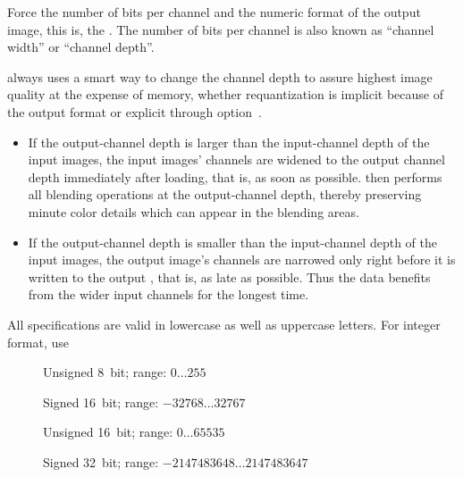 \begin{codelist}
  \label{opt:depth}%
\item[\itempar{-d \metavar{DEPTH} \\ --depth=\metavar{DEPTH}}]\itemend
  Force the number of bits per channel and the numeric format of the output image, this is, the
  .  The number of bits per channel is also known as ``channel width'' or
  ``channel depth''.

  \App{} always uses a smart way to change the channel depth to assure highest image quality at
  the expense of memory, whether requantization is implicit because of the output format or
  explicit through option~.

  \begin{itemize}
  \item
    If the output-channel depth is larger than the input-channel depth of the input images, the
    input images' channels are widened to the output channel depth immediately after loading,
    that is, as soon as possible.  \App{} then performs all blending operations at the
    output-channel depth, thereby preserving minute color details which can appear in the
    blending areas.

  \item
    If the output-channel depth is smaller than the input-channel depth of the input images, the
    output image's channels are narrowed only right before it is written to the output
    , that is, as late as possible.  Thus the data benefits from the wider input
    channels for the longest time.
  \end{itemize}

  All  specifications are valid in lowercase as well as uppercase letters.  For
  integer format, use

  \begin{description}
  \item[]\itemend
    Unsigned 8~bit; range: $0\dots255$

  \item[]\itemend
    Signed 16~bit; range: $-32768\dots32767$

  \item[]\itemend
    Unsigned 16~bit; range: $0\dots65535$

  \item[]\itemend
    Signed 32~bit; range: $-2147483648\dots2147483647$


\end{description}
\end{codelist}
